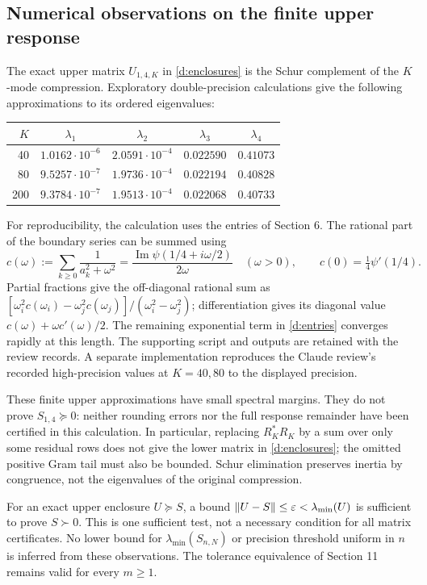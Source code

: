 \subsection{Numerical observations on the finite upper response}
The exact upper matrix $U_{1,4,K}$ in \eqref{d:enclosures} is the Schur
complement of the $K$-mode compression. Exploratory double-precision
calculations give the following approximations to its ordered eigenvalues:
\begin{center}
\begin{tabular}{rcccc}
\toprule
$K$ & $\lambda_1$ & $\lambda_2$ & $\lambda_3$ & $\lambda_4$\\\midrule
40  & $1.0162\cdot10^{-6}$ & $2.0591\cdot10^{-4}$ & $0.022590$ & $0.41073$\\
80  & $9.5257\cdot10^{-7}$ & $1.9736\cdot10^{-4}$ & $0.022194$ & $0.40828$\\
200 & $9.3784\cdot10^{-7}$ & $1.9513\cdot10^{-4}$ & $0.022068$ & $0.40733$\\
\bottomrule
\end{tabular}
\end{center}
For reproducibility, the calculation uses the entries of Section 6.
The rational part of the boundary series can be summed using
\[
c(\omega):=\sum_{k\ge0}\frac1{a_k^2+\omega^2}
=\frac{\operatorname{Im}\psi(1/4+i\omega/2)}{2\omega}
\quad(\omega>0),\qquad c(0)=\tfrac14\psi'(1/4).
\]
Partial fractions give the off-diagonal rational sum as
$[\omega_i^2c(\omega_i)-\omega_j^2c(\omega_j)]/
(\omega_i^2-\omega_j^2)$; differentiation gives its diagonal value
$c(\omega)+\omega c'(\omega)/2$. The remaining exponential term in
\eqref{d:entries} converges rapidly at this length. The supporting script
and outputs are retained with the review records. A separate
implementation reproduces the Claude review's recorded high-precision
values at $K=40,80$ to the displayed precision.

These finite upper approximations have small spectral margins.
They do not prove $S_{1,4}\succeq0$: neither rounding errors nor the full
response remainder have been certified in this calculation.
In particular, replacing $R_K^*R_K$ by a sum over only some residual rows
does not give the lower matrix in \eqref{d:enclosures}; the omitted
positive Gram tail must also be bounded. Schur elimination preserves
inertia by congruence, not the eigenvalues of the original compression.

For an exact upper enclosure $U\succeq S$, a bound
$\lVert U-S\rVert\le\varepsilon<\lambda_{\min}(U)$ is sufficient to prove
$S\succ0$. This is one sufficient test, not a necessary condition for all
matrix certificates. No lower bound for $\lambda_{\min}(S_{n,N})$ or
precision threshold uniform in $n$ is inferred from these observations.
The tolerance equivalence of Section 11 remains valid for every $m\ge1$.

